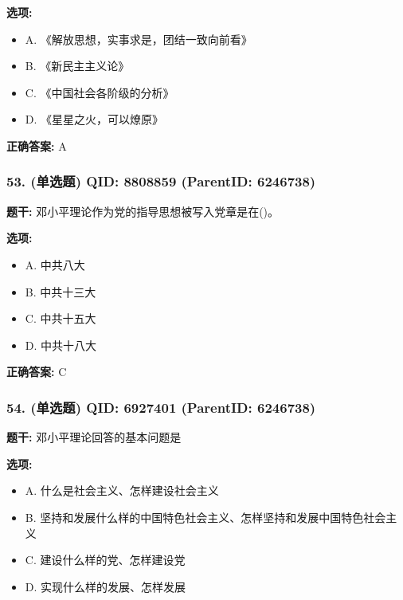 \documentclass[12pt,UTF8]{ctexart}
\begin{document}
\textbf{选项:}
\begin{itemize}[leftmargin=*]

  \item A. 《解放思想，实事求是，团结一致向前看》

  \item B. 《新民主主义论》

  \item C. 《中国社会各阶级的分析》

  \item D. 《星星之火，可以燎原》

\end{itemize}

\textbf{正确答案:}
A

\vspace{0.3em}\hrulefill\vspace{0.7em}

\subsubsection*{53. (单选题) \small QID: 8808859 (ParentID: 6246738)}

\textbf{题干:}
邓小平理论作为党的指导思想被写入党章是在()。



\textbf{选项:}
\begin{itemize}[leftmargin=*]

  \item A. 中共八大

  \item B. 中共十三大

  \item C. 中共十五大

  \item D. 中共十八大

\end{itemize}

\textbf{正确答案:}
C

\vspace{0.3em}\hrulefill\vspace{0.7em}

\subsubsection*{54. (单选题) \small QID: 6927401 (ParentID: 6246738)}

\textbf{题干:}
邓小平理论回答的基本问题是



\textbf{选项:}
\begin{itemize}[leftmargin=*]

  \item A. 什么是社会主义、怎样建设社会主义

  \item B. 坚持和发展什么样的中国特色社会主义、怎样坚持和发展中国特色社会主义

  \item C. 建设什么样的党、怎样建设党

  \item D. 实现什么样的发展、怎样发展

\end{itemize}
\end{document}

